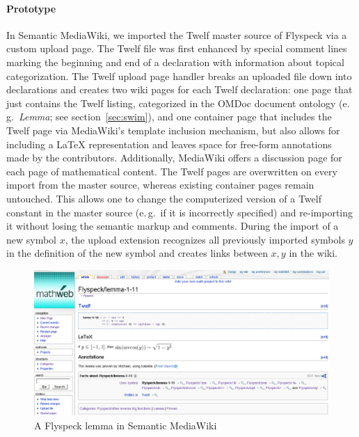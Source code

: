 \begin{contribution}
\paragraph{Prototype} In Semantic MediaWiki, we imported the Twelf master source
of Flyspeck via a custom upload page.  The Twelf file was first
enhanced by special comment lines marking the beginning and end of a
declaration with information about topical categorization.  The Twelf
upload page handler breaks an uploaded file down into declarations and
creates two wiki pages for each Twelf declaration: one page that just
contains the Twelf listing, categorized in the OMDoc document ontology
(e.\,g.\ \textit{Lemma}; see section~\ref{sec:swim}), and one
container page that includes the Twelf page via MediaWiki's template
inclusion mechanism, but also allows for including a {\LaTeX}
representation and leaves space for free-form annotations made by the
contributors.  Additionally, MediaWiki offers a discussion page for
each page of mathematical content.  The Twelf pages are overwritten on
every import from the master source, whereas existing container pages
remain untouched.  This allows one to change the computerized version
of a Twelf constant in the master source (e.\,g.\ if it is incorrectly
specified) and re-importing it without losing the semantic markup and
comments.  During the import of a new symbol $x$, the upload extension
recognizes all previously imported symbols $y$ in the definition of
the new symbol and creates links between $x,y$ in the wiki.

\begin{figure}
  \centering
  \includegraphics[width=\textwidth]{images/smw-lemma}
  \caption[A Flyspeck lemma in Semantic MediaWiki]{A Flyspeck lemma in Semantic
    MediaWiki\protect\footnotemark}
  \label{fig:smw-lemma}
\end{figure}
\addtocounter{footnote}{-1}


\end{contribution}
